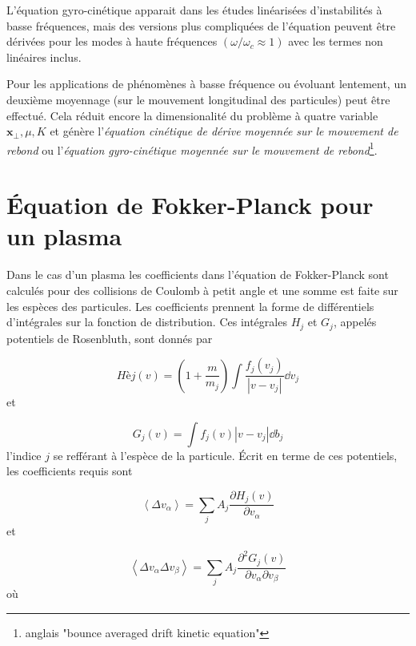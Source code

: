 \documentclass[main.tex]{subfiles}
\begin{document}
L'équation gyro-cinétique apparait dans les études linéarisées d'instabilités à basse fréquences, mais des versions plus compliquées de l'équation peuvent être dérivées pour les modes à haute fréquences \( \left( \omega / \omega_c \approx 1 \right) \) avec les termes non linéaires inclus.

Pour les applications de phénomènes à basse fréquence ou évoluant lentement, un deuxième moyennage (sur le mouvement longitudinal des particules) peut être effectué.
Cela réduit encore la dimensionalité du problème à quatre variable \( \bm{x}_\perp, \mu, K \) et génère l'\textit{équation cinétique de dérive moyennée sur le mouvement de rebond} ou l'\textit{équation gyro-cinétique moyennée sur le mouvement de rebond}\footnote{ anglais "bounce averaged drift kinetic equation"}.

\section{Équation de Fokker-Planck pour un plasma}

Dans le cas d'un plasma les coefficients dans l'équation de Fokker-Planck sont calculés pour des collisions de Coulomb à petit angle et une somme est faite sur les espèces des particules.
Les coefficients prennent la forme de différentiels d'intégrales sur la fonction de distribution.
Ces intégrales \( H_j \) et \( G_j \), appelés potentiels de Rosenbluth, sont donnés par

\begin{equation}
	Hèj \left( v \right) = \left( 1 + \frac{m}{m_j} \right) \int \frac{f_j \left( v_j \right)}{\left\vert v - v_j \right\vert} \dd v_j
	\label{eq:H_j}
\end{equation}
et

\begin{equation}
	G_j \left( v \right) = \int f_j \left(v \right) \left\vert v - v_j \right\vert \dd b_j
	\label{eq:G_j}
\end{equation}
l'indice \( j \) se refférant à l'espèce de la particule.
Écrit en terme de ces potentiels, les coefficients requis sont

\begin{equation}
	\left\langle \Delta v_\alpha \right\rangle = \sum_j A_j \frac{\partial H_j \left( v \right)}{\partial v_\alpha}
	\label{eq:coefficient_H}
\end{equation}
et

\begin{equation}
	\left\langle \Delta v_\alpha \Delta v_\beta \right\rangle = \sum_j A_j \frac{\partial^2 G_j\left(v\right)}{\partial v_\alpha \partial v_\beta}
	\label{eq:coefficient_G}
\end{equation}
où
\end{document}
